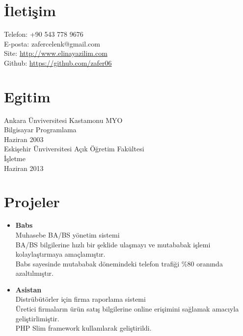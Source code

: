 \documentclass[margin,line]{res}
\begin{document}

\begin{resume}

\section{İletişim}  
Telefon: +90 543 778 9676\\
E-posta: zafercelenk@gmail.com\\
Site: \url{http://www.elinayazilim.com}\\
Github: \url{https://github.com/zafer06}\\

\section{Egitim}
Ankara Ünviversitesi Kastamonu MYO\\
Bilgisayar Programlama\\
Haziran 2003\\
\newline
Eskişehir Ünviversitesi Açık Öğretim Fakültesi\\
İşletme\\
Haziran 2013\\


\section{Projeler}
\begin{itemize} \itemsep -4pt

\item \textbf{Babs}\\
Muhasebe BA/BS yönetim sistemi\\
BA/BS bilgilerine hızlı bir şeklide ulaşmayı ve mutababak işlemi kolaylaştırmaya
amaçlamıştır.\\
Babs sayesinde mutababak dönemindeki telefon trafiği \%80 oranında azaltılmıştır.\\


\item \textbf{Asistan}\\
Distrübütörler için firma raporlama sistemi\\
Üretici firmaların ürün satış bilgilerine online erişimini 
sağlamak amacıyla geliştirlimiştir.\\
PHP Slim framework kullanılarak geliştirildi.\\

\end{itemize}


\end{resume}
\end{document}
